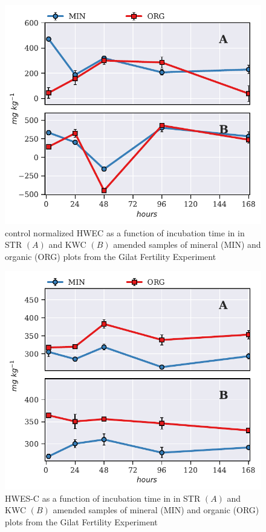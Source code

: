 			\begin{figure}[H]
				\centering
				\includegraphics[width=\linewidth]{thesis_figures/preliminary/control_normalized/HWEC.pdf}
				\caption{control normalized HWEC  as a function of incubation time in in STR $\left(A\right)$ and KWC $\left(B\right)$ amended samples of mineral (MIN) and organic (ORG) plots from the Gilat Fertility Experiment}
				\label{fig:nor_hwec_treated_preliminary}
			\end{figure}

			\begin{figure}[H]
				\centering
				\includegraphics[width=\linewidth]{thesis_figures/preliminary/treated/HWES-C.pdf}
				\caption{HWES-C  as a function of incubation time in in STR $\left(A\right)$ and KWC $\left(B\right)$ amended samples of mineral (MIN) and organic (ORG) plots from the Gilat Fertility Experiment}
				\label{fig:hwes-c_treated_preliminary}
			\end{figure}


